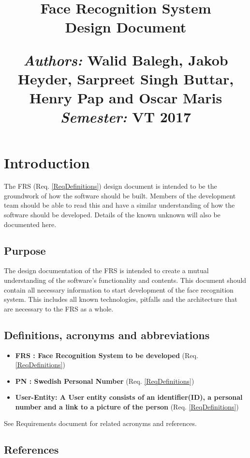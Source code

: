 \documentclass[a4paper,11pt]{article}
\title{
\vspace{-8cm}
\begin{flushleft}
    \vspace{10cm}
    \normalfont \normalsize
    \vspace{-1.3cm}
\end{flushleft}
\vspace{3cm}
\begin{flushleft}
    \huge Face Recognition System \\
    \LARGE  Design Document\\
\end{flushleft}
\null
\vfill
\begin{minipage}{\textwidth}
\begin{flushleft} \large
\emph{Authors:} Walid Balegh, Jakob Heyder, Sarpreet Singh Buttar, Henry \hspace{45pt} Pap and Oscar Maris \\ %
\emph{Semester:} VT 2017\\ %
\end{flushleft}
\end{minipage}
}
\date{}
\begin{document}
\maketitle

\newpage

\tableofcontents

\newpage


\section{Introduction}
The FRS (Req. \ref{ReqDefinitions}) design document is intended to be the groundwork of how the software should be built. Members of the development team should be able to read this and have a similar understanding of how the software should be developed. Details of the known unknown will also be documented here.

\subsection{Purpose}
The design documentation of the FRS is intended to create a mutual understanding of the software's functionality and contents. This document should contain all necessary information to start development of the face recognition system. This includes all known technologies, pitfalls and the architecture that are necessary to the FRS as a whole. 

\subsection{Definitions, acronyms and abbreviations}
\begin{itemize}
 
\item \textbf{FRS : Face Recognition System to be developed} (Req. \ref{ReqDefinitions})
\item \textbf{PN : Swedish Personal Number} (Req. \ref{ReqDefinitions})
\item \textbf{User-Entity: A User entity consists of an identifier(ID), a personal number and a link to a picture of the person} (Req. \ref{ReqDefinitions})
\end{itemize}
 
See Requirements document for related acronyms and references.

\subsection{References}
\end{document}
